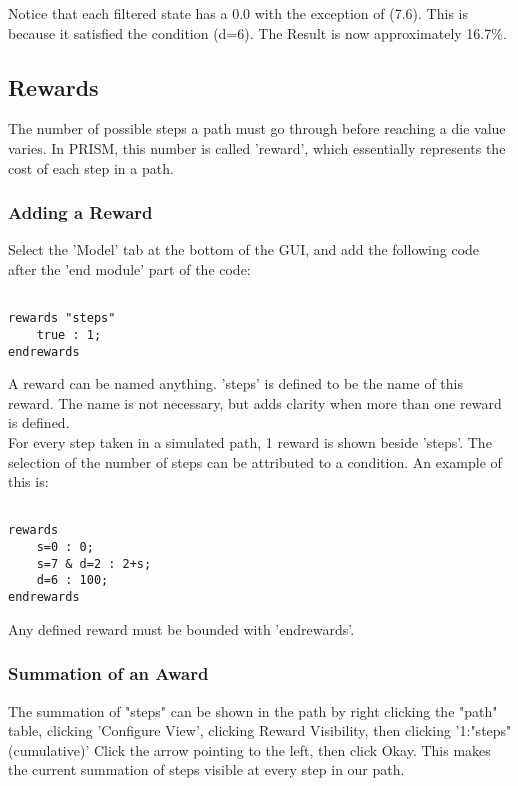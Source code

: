 \documentclass[a4paper]{article}
\begin{document}
Notice that each filtered state has a 0.0 with the exception of (7.6). This is because it satisfied the condition (d=6). The Result is now approximately 16.7\%.

\subsection{Rewards}
The number of possible steps a path must go through before reaching a die value varies. In PRISM, this number is called 'reward', which essentially represents the cost of each step in a path. 


\subsubsection{Adding a Reward}
Select the 'Model' tab at the bottom of the GUI, and add the following code after the 'end module' part of the code:


\begin{lstlisting}

rewards "steps"
	true : 1;
endrewards

\end{lstlisting}

A reward can be named anything. 'steps' is defined to be the name of this reward. The name is not necessary, but adds clarity when more than one reward is defined.
\\[1\baselineskip]
For every step taken in a simulated path, 1 reward is shown beside 'steps'. The selection of the number of steps can be attributed to a condition. An example of this is:

\begin{lstlisting}

rewards
    s=0 : 0;
    s=7 & d=2 : 2+s;
    d=6 : 100;
endrewards

\end{lstlisting}

Any defined reward must be bounded with 'endrewards'.

\subsubsection{Summation of an Award}

The summation of "steps" can be shown in the path by 
right clicking the "path" table, clicking 'Configure View', clicking Reward Visibility, then clicking 
\newline
'1:"steps" (cumulative)'
\newline
Click the arrow pointing to the left, then click Okay. This makes the current summation of steps visible at every step in our path.
\end{document}
